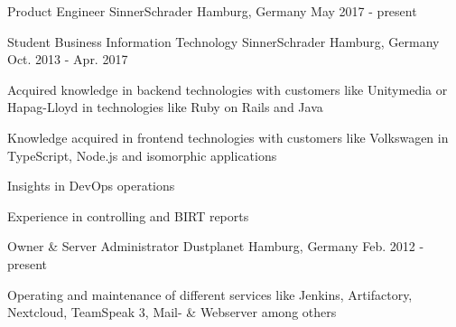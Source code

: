 

\begin{cventries}

  \cventry
    {Product Engineer} %
    {SinnerSchrader} %
    {Hamburg, Germany} %
    {May 2017 - present} %
    {
    }

  \cventry
    {Student Business Information Technology} %
    {SinnerSchrader} %
    {Hamburg, Germany} %
    {Oct. 2013 - Apr. 2017} %
    {
      \begin{cvitems} %
        \item {Acquired knowledge in backend technologies with customers like Unitymedia or Hapag-Lloyd in technologies like Ruby on Rails and Java}
        \item {Knowledge acquired in frontend technologies with customers like Volkswagen in TypeScript, Node.js and isomorphic applications}
        \item {Insights in DevOps operations}
        \item {Experience in controlling and BIRT reports}
      \end{cvitems}
    }

  \cventry
    {Owner \& Server Administrator} %
    {Dustplanet} %
    {Hamburg, Germany} %
    {Feb. 2012 - present} %
    {
      \begin{cvitems} %
      	\item {Operating and maintenance of different services like Jenkins, Artifactory, Nextcloud, TeamSpeak 3, Mail- \& Webserver among others}
      \end{cvitems}
    }

\end{cventries}
